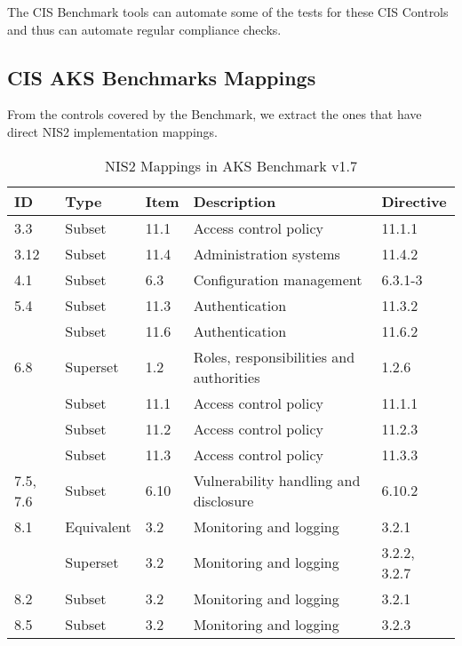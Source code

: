 \pagebreak

The CIS Benchmark tools can automate some of the tests for these CIS Controls and thus can automate regular compliance checks.

\subsection{CIS AKS Benchmarks Mappings}

From the controls covered by the Benchmark, we extract the ones that have direct NIS2 implementation mappings.

\pagebreak

\begin{table}[ht]
  \caption{NIS2 Mappings in AKS Benchmark v1.7}
    \begin{tabular}{| l | l | l | l | l |}
    \hline
    ID & Type & Item & Description & Directive \\
    \hline\hline
    3.3 & Subset & 11.1 & Access control policy & 11.1.1 \\
    \hline
    3.12 & Subset & 11.4 & Administration systems & 11.4.2 \\
    \hline
    4.1 & Subset & 6.3 & Configuration management & 6.3.1-3 \\
    \hline
    5.4 & Subset & 11.3 & Authentication & 11.3.2 \\
    \hline
    & Subset & 11.6 & Authentication & 11.6.2 \\
    \hline
    6.8 & Superset & 1.2 & Roles, responsibilities and authorities & 1.2.6 \\
    \hline
    & Subset & 11.1 & Access control policy & 11.1.1 \\
    \hline
    & Subset & 11.2 & Access control policy & 11.2.3 \\
    \hline
    & Subset & 11.3 & Access control policy & 11.3.3 \\
    \hline
    7.5, 7.6 & Subset & 6.10 & Vulnerability handling and disclosure & 6.10.2 \\
    \hline
    8.1 & Equivalent & 3.2 & Monitoring and logging & 3.2.1 \\
    \hline
    & Superset & 3.2 & Monitoring and logging & 3.2.2, 3.2.7 \\
    \hline
    8.2 & Subset & 3.2 & Monitoring and logging & 3.2.1 \\
    \hline
    8.5 & Subset & 3.2 & Monitoring and logging & 3.2.3 \\
    \hline
    \end{tabular}%
  \label{tab:aksMapping}%
\end{table}%

